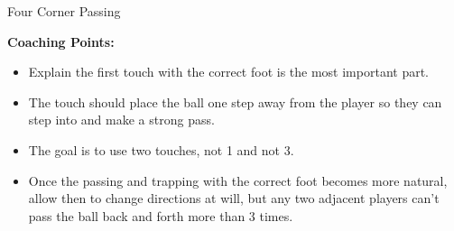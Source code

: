 \begin{evenBlock}{Four Corner Passing}
\begin{minipage}[t]{\linewidth}
        \raggedright
        \textbf{Coaching Points:}
        \begin{itemize}
            \setlength{\itemsep}{0pt}
            \setlength{\parskip}{0pt}
            \setlength{\parsep}{0pt}
            \item Explain the first touch with the correct foot is the most important part.
            \item The touch should place the ball one step away from the player so they can step into and make a strong pass.
            \item The goal is to use two touches, not 1 and not 3.
            \item Once the passing and trapping with the correct foot becomes more natural, allow then to change directions at will, but any two adjacent players can't pass the ball back and forth more than 3 times.
        \end{itemize}

    
\end{minipage}

\end{evenBlock}